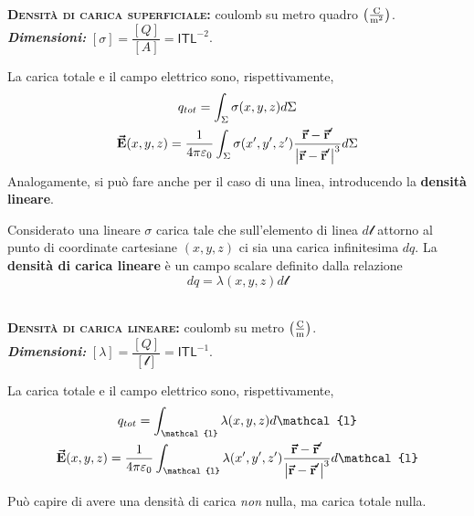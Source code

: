 \begin{units}~\\
	\textbf{\textsc{Densità di carica superficiale:}} coulomb su metro quadro $\left(\unit[per-mode = fraction]{\coulomb\per\square\meter}\right)$.\\
	\textit{\textbf{Dimensioni:}} $[\sigma]=\dfrac{[Q]}{[A]}=\mathsf{I}\mathsf{T}\mathsf{L}^{-2}$.
\end{units}
La carica totale e il campo elettrico sono, rispettivamente,
\begin{gather}
		q_{tot}=\int_\Sigma\sigma(x,y,z)d\Sigma\\
		\vb*{\va{E}}(x,y,z)=\frac{1}{4\pi\varepsilon_0}\int_\Sigma\sigma(x',y',z')\frac{\vb*{\va{r}}-\vb*{\va{r}}'}{\abs{\vb*{\va{r}}-\vb*{\va{r}}'}^3}d\Sigma
\end{gather}
Analogamente, si può fare anche per il caso di una linea, introducendo la \textbf{densità lineare}.
\begin{define}
	Considerato una lineare $\sigma$ carica tale che sull'elemento di linea $d\mathcal{l}$ attorno al punto di coordinate cartesiane $(x,y,z)$ ci sia una carica infinitesima $dq$. La \textbf{densità di carica lineare} è un campo scalare definito dalla relazione
	\begin{equation}
		dq=\lambda(x,y,z)d\mathcal{l}
	\end{equation}
\end{define}

\begin{units}~\\
	\textbf{\textsc{Densità di carica lineare:}} coulomb su metro $\left(\unit[per-mode = fraction]{\coulomb\per\meter}\right)$.\\
	\textit{\textbf{Dimensioni:}} $[\lambda]=\dfrac{[Q]}{[\mathcal{l}]}=\mathsf{I}\mathsf{T}\mathsf{L}^{-1}$.
\end{units}
La carica totale e il campo elettrico sono, rispettivamente,
\begin{gather}
	q_{tot}=\int_\mathcal{l}\lambda(x,y,z)d\mathcal{l}\\
	\vba{E}(x,y,z)=\frac{1}{4\pi\epsilon_0}\int_\mathcal{l}\lambda(x',y',z')\frac{\vba{r}-\vba{r}'}{\abs{\vba{r}-\vba{r}'}^3}d\mathcal{l}
\end{gather}
\begin{observe}
	Può capire di avere una densità di carica \textit{non} nulla, ma carica totale nulla.
\end{observe}
